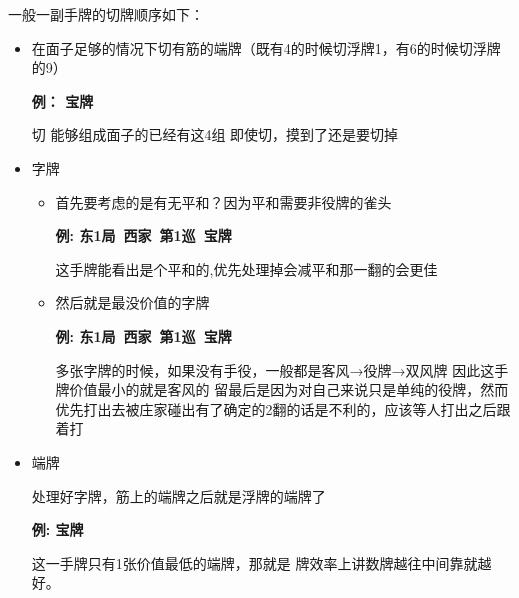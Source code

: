 \documentclass[小V的日麻笔记.tex]{subfiles}
\begin{document}
一般一副手牌的切牌顺序如下：
\begin{itemize}
\item 在面子足够的情况下切有筋的端牌（既有4的时候切浮牌1，有6的时候切浮牌的9）

\textbf{例： 宝牌 }

\begin{itemize}
\arrowitem 切 
\arrowitem 能够组成面子的已经有这4组
\arrowitem 即使切，摸到了还是要切掉
\end{itemize}

\item 字牌
\begin{itemize}
\item 首先要考虑的是有无平和？因为平和需要非役牌的雀头

\textbf{例: 东1局\ 西家\ 第1巡\ 宝牌 }


\begin{itemize}
\arrowitem 这手牌能看出是个平和的,优先处理掉会减平和那一翻的会更佳
\end{itemize}

\item 然后就是最没价值的字牌

\textbf{例: 东1局\ 西家\ 第1巡\ 宝牌 }

\begin{itemize}
\arrowitem 多张字牌的时候，如果没有手役，一般都是客风→役牌→双风牌
\arrowitem 因此这手牌价值最小的就是客风的 
\arrowitem {}留最后是因为对自己来说只是单纯的役牌，然而优先打出去被庄家碰出有了确定的2翻的话是不利的，应该等人打出之后跟着打
\end{itemize}
\end{itemize}

\item 端牌

处理好字牌，筋上的端牌之后就是浮牌的端牌了

\textbf{例: 宝牌 }


\begin{itemize}
\arrowitem 这一手牌只有1张价值最低的端牌，那就是 
\arrowitem 牌效率上讲数牌越往中间靠就越好。
\end{itemize}


\end{itemize}
\end{document}

